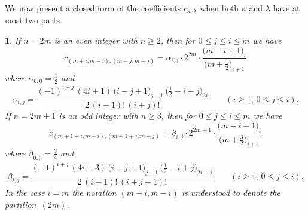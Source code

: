 \documentclass[10pt,oneside,american]{amsart}
\numberwithin{equation}{section}
\numberwithin{figure}{section}
\theoremstyle{definition}
\theoremstyle{remark}
\theoremstyle{plain}
\theoremstyle{definition}
\theoremstyle{plain}
\newtheorem{thm}{\protect\theoremname}[section]
\theoremstyle{plain}
\theoremstyle{plain}
\providecommand{\theoremname}{Theorem}
\begin{document}
We now present a closed form of the coefficients $c_{\kappa,\lambda}$ when
both $\kappa$ and $\lambda$ have at most two parts.
\begin{thm}
  If $n=2m$ is an even integer with $n\geq2$, then for $0\leq j\leq i\leq m$
  we have
  \begin{equation}\label{eq:cf2even}
    c_{(m+i,m-i),(m+j,m-j)} = \alpha_{i,j}\cdot 2^{2m}\cdot
    \frac{\bigl(m-i+1\bigr)_{\!i}}{\bigl(m+\frac12\bigr)_{\!i+1}}
  \end{equation}
  where $\alpha_{0,0}=\frac12$ and
  \[
    \alpha_{i,j} = \frac{(-1)^{i+j} \, (4i+1) \, \bigl(i-j+1\bigr)_{\!j-1} \,
      \bigl(\frac12-i+j\bigr)_{\!2i}}{2 \, (i-1)! \, (i+j)!}
    \qquad (i\geq1,\,0\leq j\leq i).
  \]
  If $n=2m+1$ is an odd integer with $n\geq3$, then for $0\leq j\leq i\leq m$
  we have
  \begin{equation}\label{eq:cf2odd}
    c_{(m+1+i,m-i),(m+1+j,m-j)} = \beta_{i,j}\cdot 2^{2m+1}\cdot
    \frac{\bigl(m-i+1\bigr)_{\!i}}{\bigl(m+\frac32\bigr)_{\!i+1}}
  \end{equation}
  where $\beta_{0,0}=\frac34$ and
  \[
    \beta_{i,j} = \frac{(-1)^{i+j} \, (4i+3) \, \bigl(i-j+1\bigr)_{\!j-1} \,
      \bigl(\frac12-i+j\bigr)_{\!2i+1}}{2 \, (i-1)! \, (i+j+1)!}
    \qquad (i\geq1,\,0\leq j\leq i).
  \]
  In the case $i=m$ the notation $(m+i,m-i)$ is understood to denote the
  partition~$(2m)$.
\end{thm}
\end{document}
